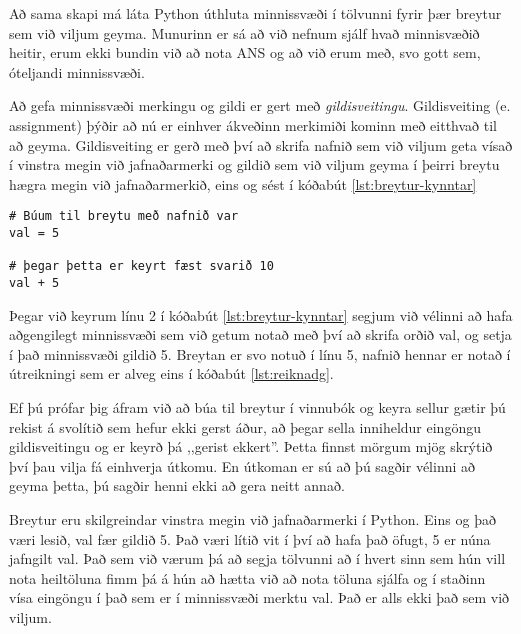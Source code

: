 Að sama skapi má láta Python úthluta minnissvæði í tölvunni fyrir þær breytur sem við viljum geyma.
Munurinn er sá að við nefnum sjálf hvað minnisvæðið heitir, erum ekki bundin við að nota ANS og að við erum með, svo gott sem, óteljandi minnissvæði.

Að gefa minnissvæði merkingu og gildi er gert með \textit{gildisveitingu}.
Gildisveiting (e. assignment) þýðir að nú er einhver ákveðinn merkimiði kominn með eitthvað til að geyma.
Gildisveiting er gerð með því að skrifa nafnið sem við viljum geta vísað í vinstra megin við jafnaðarmerki og gildið sem við viljum geyma í þeirri breytu hægra megin við jafnaðarmerkið, eins og sést í kóðabút \ref{lst:breytur-kynntar}

\begin{lstlisting}[caption=Breytur kynntar, label=lst:breytur-kynntar]
# Búum til breytu með nafnið var
val = 5

# þegar þetta er keyrt fæst svarið 10
val + 5
\end{lstlisting}

Þegar við keyrum línu 2 í kóðabút \ref{lst:breytur-kynntar} segjum við vélinni að hafa aðgengilegt minnissvæði sem við getum notað með því að skrifa orðið val, og setja í það minnissvæði gildið 5.
Breytan er svo notuð í línu 5, nafnið hennar er notað í útreikningi sem er alveg eins í kóðabút \ref{lst:reiknadg}.

\begin{valBox}
Ef þú prófar þig áfram við að búa til breytur í vinnubók og keyra sellur gætir þú rekist á svolítið sem hefur ekki gerst áður, að þegar sella inniheldur eingöngu gildisveitingu og er keyrð þá ,,gerist ekkert''.
Þetta finnst mörgum mjög skrýtið því þau vilja fá einhverja útkomu.
En útkoman er sú að þú sagðir vélinni að geyma þetta, þú sagðir henni ekki að gera neitt annað.	
\end{valBox}

Breytur eru skilgreindar vinstra megin við jafnaðarmerki í Python.
Eins og það væri lesið, val fær gildið 5.
Það væri lítið vit í því að hafa það öfugt, 5 er núna jafngilt val.
Það sem við værum þá að segja tölvunni að í hvert sinn sem hún vill nota heiltöluna fimm þá á hún að hætta við að nota töluna sjálfa og í staðinn vísa eingöngu í það sem er í minnissvæði merktu val.
Það er alls ekki það sem við viljum.

